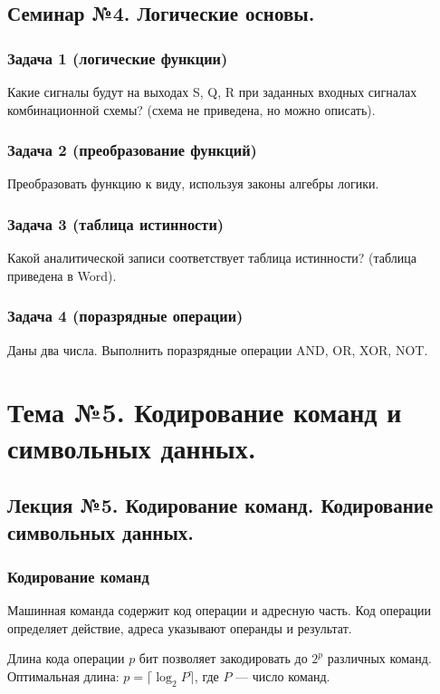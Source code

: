 \documentclass[a4paper,14pt]{report}
\begin{document}
\section{Семинар №4. Логические основы.}

\subsection*{Задача 1 (логические функции)}
Какие сигналы будут на выходах S, Q, R при заданных входных сигналах комбинационной схемы? (схема не приведена, но можно описать).

\subsection*{Задача 2 (преобразование функций)}
Преобразовать функцию к виду, используя законы алгебры логики.

\subsection*{Задача 3 (таблица истинности)}
Какой аналитической записи соответствует таблица истинности? (таблица приведена в Word).

\subsection*{Задача 4 (поразрядные операции)}
Даны два числа. Выполнить поразрядные операции AND, OR, XOR, NOT.


\chapter{Тема №5. Кодирование команд и символьных данных.}
\section{Лекция №5. Кодирование команд. Кодирование символьных данных.}

\subsection{Кодирование команд}
Машинная команда содержит код операции и адресную часть. Код операции определяет действие, адреса указывают операнды и результат.

Длина кода операции $p$ бит позволяет закодировать до $2^p$ различных команд. Оптимальная длина: $p = \lceil \log_2 P \rceil$, где $P$ — число команд.
\end{document}
